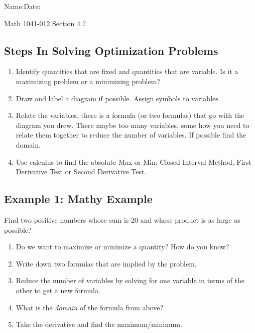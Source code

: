 \documentclass[10pt]{book}
\theoremstyle{definition}
\begin{document}
\begin{flushleft}
Name:\underline{\hspace{13cm}}Date:\underline{\hspace{2cm}}
\end{flushleft}
\begin{center}
{\Large Math 1041-012 \hspace{0.5cm} Section 4.7}
\end{center}

\begin{tcolorbox}
\subsection*{Steps In Solving Optimization Problems}
\begin{enumerate}
    \item Identify quantities that are fixed and quantities that are variable. Is it a maximizing problem or a minimizing problem?
    \item Draw and label a diagram if possible. Assign symbols to variables.
    \item Relate the variables, there is a formula (or two formulas) that go with the diagram you drew. There maybe too many variables, some how you need to relate them together to reduce the number of variables. If possible find the domain. 
    \item Use calculus to find the absolute Max or Min: Closed Interval Method, First Derivative Test or Second Derivative Test.
\end{enumerate}
\end{tcolorbox}
\subsection*{Example 1: Mathy Example}
Find two positive numbers whose sum is 20 and whose product is as large as possible?
\begin{enumerate}[label=(\alph*)]
    \item Do we want to maximize or minimize a quantity? How do you know?
    \item Write down two formulas that are implied by the problem.\vspace{2cm}
    \item Reduce the number of variables by solving for one variable in terms of the other to get a new formula.\vspace{3cm}
    \item What is the \textit{domain} of the formula from above?\vspace{1cm}
    \item Take the derivative and find the maximum/minimum.
\end{enumerate}
\clearpage
\end{document}
